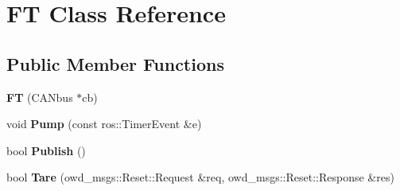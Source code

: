 \hypertarget{classFT}{\section{F\-T Class Reference}
\label{classFT}
}
\subsection*{Public Member Functions}
\begin{DoxyCompactItemize}
\item 
\hypertarget{classFT_a11703ceb5b7f3aa1cd1903ab595c26f9}{{\bfseries F\-T} (C\-A\-Nbus $\ast$cb)}\label{classFT_a11703ceb5b7f3aa1cd1903ab595c26f9}

\item 
\hypertarget{classFT_a8d504ffbae52ea9410a89a5140fbfd89}{void {\bfseries Pump} (const ros\-::\-Timer\-Event \&e)}\label{classFT_a8d504ffbae52ea9410a89a5140fbfd89}

\item 
\hypertarget{classFT_a8d6be6b36c0fa5feaac9a9ab94757ffc}{bool {\bfseries Publish} ()}\label{classFT_a8d6be6b36c0fa5feaac9a9ab94757ffc}

\item 
\hypertarget{classFT_ade37313274d1fcff7126d92f40609245}{bool {\bfseries Tare} (owd\-\_\-msgs\-::\-Reset\-::\-Request \&req, owd\-\_\-msgs\-::\-Reset\-::\-Response \&res)}\label{classFT_ade37313274d1fcff7126d92f40609245}

\end{DoxyCompactItemize}
